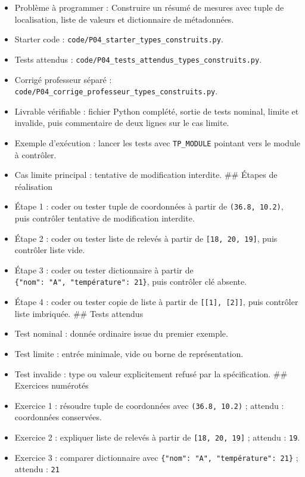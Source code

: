 \begin{itemize}
\tightlist
\item
  Problème à programmer : Construire un résumé de mesures avec tuple de
  localisation, liste de valeurs et dictionnaire de métadonnées.
\item
  Starter code : \texttt{code/P04\_starter\_types\_construits.py}.
\item
  Tests attendus :
  \texttt{code/P04\_tests\_attendus\_types\_construits.py}.
\item
  Corrigé professeur séparé :
  \texttt{code/P04\_corrige\_professeur\_types\_construits.py}.
\item
  Livrable vérifiable : fichier Python complété, sortie de tests
  nominal, limite et invalide, puis commentaire de deux lignes sur le
  cas limite.
\item
  Exemple d'exécution : lancer les tests avec \texttt{TP\_MODULE}
  pointant vers le module à contrôler.
\item
  Cas limite principal : tentative de modification interdite. \#\#
  Étapes de réalisation
\item
  Étape 1 : coder ou tester tuple de coordonnées à partir de
  \texttt{(36.8,\ 10.2)}, puis contrôler tentative de modification
  interdite.
\item
  Étape 2 : coder ou tester liste de relevés à partir de
  \texttt{{[}18,\ 20,\ 19{]}}, puis contrôler liste vide.
\item
  Étape 3 : coder ou tester dictionnaire à partir de
  \texttt{\{"nom":\ "A",\ "température":\ 21\}}, puis contrôler clé
  absente.
\item
  Étape 4 : coder ou tester copie de liste à partir de
  \texttt{{[}{[}1{]},\ {[}2{]}{]}}, puis contrôler liste imbriquée. \#\#
  Tests attendus
\item
  Test nominal : donnée ordinaire issue du premier exemple.
\item
  Test limite : entrée minimale, vide ou borne de représentation.
\item
  Test invalide : type ou valeur explicitement refusé par la
  spécification. \#\# Exercices numérotés
\item
  Exercice 1 : résoudre tuple de coordonnées avec \texttt{(36.8,\ 10.2)}
  ; attendu : coordonnées conservées.
\item
  Exercice 2 : expliquer liste de relevés à partir de
  \texttt{{[}18,\ 20,\ 19{]}} ; attendu : \texttt{19}.
\item
  Exercice 3 : comparer dictionnaire avec
  \texttt{\{"nom":\ "A",\ "température":\ 21\}} ; attendu : \texttt{21}

\end{itemize}
